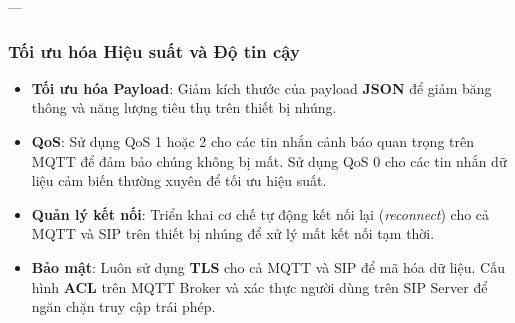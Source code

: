 ---

\subsubsection{Tối ưu hóa Hiệu suất và Độ tin cậy}
\label{subsec:optimization}

\begin{itemize}
    \item \textbf{Tối ưu hóa Payload}: Giảm kích thước của payload \textbf{JSON} để giảm băng thông và năng lượng tiêu thụ trên thiết bị nhúng.
    \item \textbf{QoS}: Sử dụng QoS 1 hoặc 2 cho các tin nhắn cảnh báo quan trọng trên MQTT để đảm bảo chúng không bị mất. Sử dụng QoS 0 cho các tin nhắn dữ liệu cảm biến thường xuyên để tối ưu hiệu suất.
    \item \textbf{Quản lý kết nối}: Triển khai cơ chế tự động kết nối lại (\textit{reconnect}) cho cả MQTT và SIP trên thiết bị nhúng để xử lý mất kết nối tạm thời.
    \item \textbf{Bảo mật}: Luôn sử dụng \textbf{TLS} cho cả MQTT và SIP để mã hóa dữ liệu. Cấu hình \textbf{ACL} trên MQTT Broker và xác thực người dùng trên SIP Server để ngăn chặn truy cập trái phép.
\end{itemize}
